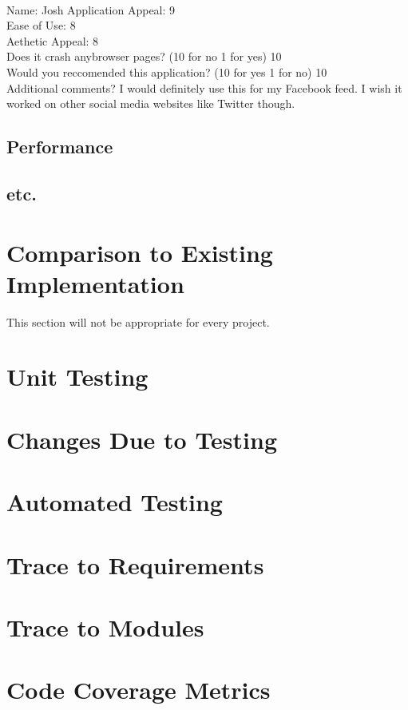 \documentclass[12pt, titlepage]{article}
\begin{document}
\\
Name: Josh
Application Appeal: 9 \\ 
Ease of Use: 8\\ 
Aethetic Appeal: 8\\ 
Does it crash anybrowser pages? (10 for no 1 for yes) 10\\ 
Would you reccomended this application? (10 for yes 1 for no) 10\\ 
Additional comments? I would definitely use this for my Facebook feed. I wish it worked on other social media websites like Twitter though.\\
\subsection{Performance}
\subsection{etc.}
	
\section{Comparison to Existing Implementation}	
This section will not be appropriate for every project.
\section{Unit Testing}
\section{Changes Due to Testing}
\section{Automated Testing}
		
\section{Trace to Requirements}
		
\section{Trace to Modules}		
\section{Code Coverage Metrics}
\end{document}
